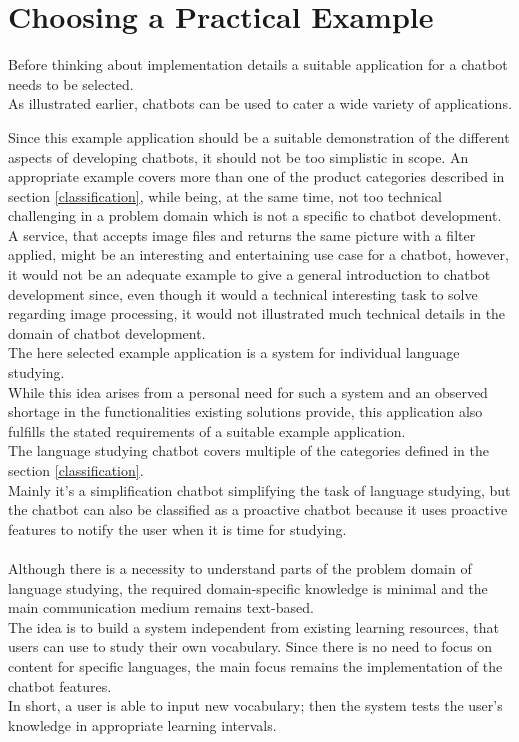 \section{Choosing a Practical Example}

Before thinking about implementation details a suitable application for a chatbot needs to be selected.
\\
As illustrated earlier, chatbots can be used to cater a wide variety of applications.

Since this example application should be a suitable demonstration of the different aspects of developing chatbots,
it should not be too simplistic in scope.
An appropriate example covers more than one of the product categories described in section \ref{classification},
while being, at the same time, not too technical challenging in a problem domain which is not a specific to chatbot development.
\\
A service, that accepts image files and returns the same picture with a filter applied, might be an interesting and entertaining use case for a chatbot, however, it would not be an adequate example to give a general introduction to chatbot development since, even though it would a technical interesting task to solve regarding image processing, it would not illustrated much technical details in the domain of chatbot development.
\\

The here selected example application is a system for individual language studying.
\\
While this idea arises from a personal need for such a system and an observed shortage in the functionalities existing solutions provide,
this application also fulfills the stated requirements of a suitable example application.
\\

The language studying chatbot covers multiple of the categories defined in the section \ref{classification}.\\
Mainly it's a simplification chatbot simplifying the task of language studying,
but the chatbot can also be classified as a proactive chatbot because it uses proactive features to notify the user when it is time for studying.
\\

\\
Although there is a necessity to understand parts of the problem domain of language studying,
the required domain-specific knowledge is minimal and the main communication medium remains text-based.
\\

The idea is to build a system independent from existing learning resources, that users can use to study their own vocabulary.
Since there is no need to focus on content for specific languages, the main focus remains the implementation of the chatbot features.
\\
In short, a user is able to input new vocabulary; then the system tests the user's knowledge in appropriate learning intervals.
